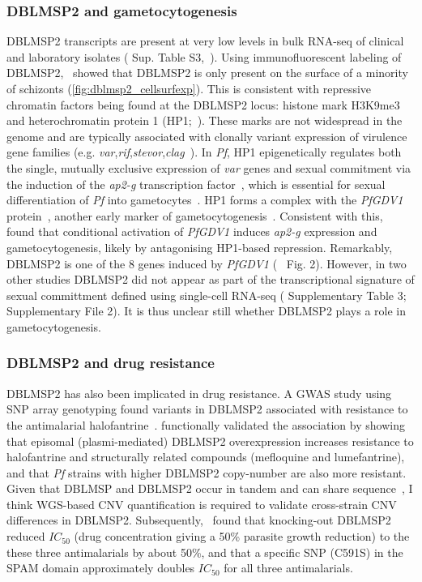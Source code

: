 \documentclass[12pt]{article}
\begin{document}
\subsubsection{DBLMSP2 and gametocytogenesis}
DBLMSP2 transcripts are present at very low levels in bulk RNA-seq of clinical and
laboratory isolates (\cite{Otto2010} Sup. Table S3,~\cite{AmambuaNgwa2012}).
Using immunofluorescent labeling of DBLMSP2,~\cite{AmambuaNgwa2012} showed that DBLMSP2
is only present on the surface of a minority of schizonts (\cref{fig:dblmsp2_cellsurfexp}).
This is consistent with repressive chromatin factors being found at the DBLMSP2
locus: histone mark H3K9me3~\cite{LopezRubio2009} and heterochromatin protein 1
(HP1;~\cite{Fraschka2018}). These marks are not widespread in the genome and are typically
associated with clonally variant expression of virulence gene families
(e.g. \textit{var},\textit{rif},\textit{stevor},\textit{clag}~\cite{LopezRubio2009}). In
\textit{Pf}, HP1 epigenetically regulates both the single, mutually exclusive expression of
\textit{var} genes and sexual commitment via the induction of the
\textit{ap2-g} transcription factor~\cite{Brancucci2014}, which is essential for sexual
differentiation of \textit{Pf} into gametocytes~\cite{Kafsack2014}. HP1 forms a complex with
the \textit{PfGDV1} protein~\cite{Filarsky2018}, another early marker of gametocytogenesis~\cite{Eksi2012}.
Consistent with this,~\cite{Filarsky2018} found that conditional activation of \textit{PfGDV1} induces \textit{ap2-g}
expression and gametocytogenesis, likely by antagonising HP1-based repression.
Remarkably, DBLMSP2 is one of the 8 genes induced by \textit{PfGDV1}
(~\cite{Filarsky2018} Fig. 2). However, in two other studies DBLMSP2 did not appear as part of the transcriptional
signature of sexual committment defined using single-cell RNA-seq (\cite{Poran2017} Supplementary Table
3;~\cite{Brancucci2018} Supplementary File 2). It is thus unclear still whether DBLMSP2
plays a role in gametocytogenesis.

\subsubsection{DBLMSP2 and drug resistance}
DBLMSP2 has also been implicated in drug resistance. A GWAS study using SNP array
genotyping found variants in DBLMSP2 associated with resistance to the antimalarial
halofantrine~\cite{VanTyne2011}. \cite{VanTyne2011} functionally validated the
association by showing that episomal (plasmi-mediated) DBLMSP2 overexpression increases
resistance to halofantrine and structurally related compounds (mefloquine and
lumefantrine), and that \textit{Pf} strains with higher DBLMSP2 copy-number are also
more resistant. Given that DBLMSP and DBLMSP2 occur in tandem and can share
sequence~\cite{maciuca_analysis_2017}, I think WGS-based CNV quantification is 
required to validate cross-strain CNV differences in DBLMSP2.
Subsequently,~\cite{VanTyne2013} found that knocking-out DBLMSP2 reduced $IC_{50}$ (drug
concentration giving a 50\% parasite growth reduction) to the
these three antimalarials by about 50\%, and that a specific SNP (C591S) in the SPAM domain
approximately doubles $IC_{50}$ for all three antimalarials.
\end{document}
